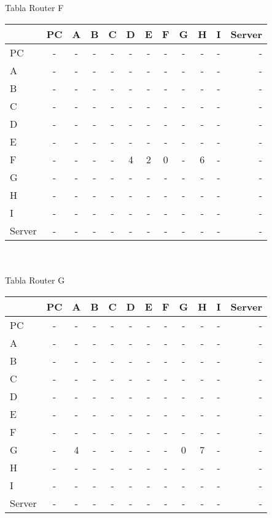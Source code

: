 \documentclass{article}
\begin{document}
\\
\\
Tabla Router F \\
\begin{tabular}{l*{10}{c}r}
              & PC & A & B & C & D & E & F & G & H & I & Server \\
\hline
PC             & - & - & - & - & - & - & - & - & - & - & -\\
A              & - & - & - & - & - & - & - & - & - & - & -\\
B              & - & - & - & - & - & - & - & - & - & - & -\\
C              & - & - & - & - & - & - & - & - & - & - & -\\
D              & - & - & - & - & - & - & - & - & - & - & -\\
E              & - & - & - & - & - & - & - & - & - & - & -\\
F              & - & - & - & - & 4 & 2 & 0 & - & 6 & - & -\\
G              & - & - & - & - & - & - & - & - & - & - & -\\
H              & - & - & - & - & - & - & - & - & - & - & -\\
I              & - & - & - & - & - & - & - & - & - & - & -\\
Server         & - & - & - & - & - & - & - & - & - & - & -\\

\end{tabular}
\\
\\
Tabla Router G \\
\begin{tabular}{l*{10}{c}r}
              & PC & A & B & C & D & E & F & G & H & I & Server \\
\hline
PC             & - & - & - & - & - & - & - & - & - & - & -\\
A              & - & - & - & - & - & - & - & - & - & - & -\\
B              & - & - & - & - & - & - & - & - & - & - & -\\
C              & - & - & - & - & - & - & - & - & - & - & -\\
D              & - & - & - & - & - & - & - & - & - & - & -\\
E              & - & - & - & - & - & - & - & - & - & - & -\\
F              & - & - & - & - & - & - & - & - & - & - & -\\
G              & - & 4 & - & - & - & - & - & 0 & 7 & - & -\\
H              & - & - & - & - & - & - & - & - & - & - & -\\
I              & - & - & - & - & - & - & - & - & - & - & -\\
Server         & - & - & - & - & - & - & - & - & - & - & -\\

\end{tabular}
\end{document}
